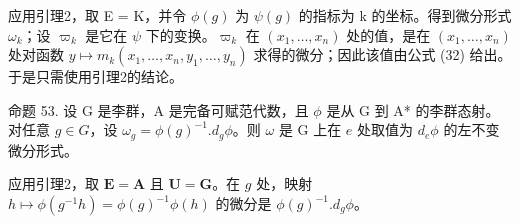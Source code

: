 应用引理2，取 E = K，并令 \(\phi(g)\) 为 \(\psi(g)\) 的指标为 k 的坐标。得到微分形式 \(\omega_{k}\)；设 \(\varpi_{k}\) 是它在 \(\psi\) 下的变换。\(\varpi_{k}\) 在 \((x_{1},\ldots,x_{n})\) 处的值，是在 \((x_{1},\ldots,x_{n})\) 处对函数 \(y\mapsto m_{k}(x_{1},\ldots,x_{n},y_{1},\ldots,y_{n})\) 求得的微分；因此该值由公式 (32) 给出。于是只需使用引理2的结论。

命题 53. 设 G 是李群，A 是完备可赋范代数，且 \(\phi\) 是从 G 到 A* 的李群态射。对任意 \(g \in G\)，设 \(\omega_g = \phi(g)^{-1}.d_g\phi\)。则 \(\omega\) 是 G 上在 \(e\) 处取值为 \(d_e\phi\) 的左不变微分形式。

应用引理2，取 \(\mathbf{E} = \mathbf{A}\) 且 \(\mathbf{U} = \mathbf{G}\)。在 \(g\) 处，映射 \(h \mapsto \phi(g^{-1}h) = \phi(g)^{-1}\phi(h)\) 的微分是 \(\phi(g)^{-1}.d_g\phi\)。

